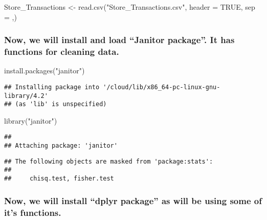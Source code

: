 \documentclass[
]{article}
\newenvironment{Shaded}{\begin{snugshade}}{\end{snugshade}}
\newcommand{\AttributeTok}[1]{\textcolor[rgb]{0.77,0.63,0.00}{#1}}
\newcommand{\ConstantTok}[1]{\textcolor[rgb]{0.00,0.00,0.00}{#1}}
\newcommand{\FunctionTok}[1]{\textcolor[rgb]{0.00,0.00,0.00}{#1}}
\newcommand{\NormalTok}[1]{#1}
\newcommand{\OtherTok}[1]{\textcolor[rgb]{0.56,0.35,0.01}{#1}}
\newcommand{\StringTok}[1]{\textcolor[rgb]{0.31,0.60,0.02}{#1}}
\begin{document}
\begin{Shaded}
\begin{Highlighting}[]
\NormalTok{Store\_Transactions }\OtherTok{\textless{}{-}} \FunctionTok{read.csv}\NormalTok{(}\StringTok{"Store\_Transactions.csv"}\NormalTok{, }\AttributeTok{header =} \ConstantTok{TRUE}\NormalTok{, }\AttributeTok{sep =} \StringTok{\textquotesingle{},\textquotesingle{}}\NormalTok{)}
\end{Highlighting}
\end{Shaded}

\hypertarget{now-we-will-install-and-load-janitor-package.-it-has-functions-for-cleaning-data.}{%
\subsubsection{Now, we will install and load ``Janitor package''. It has
functions for cleaning
data.}\label{now-we-will-install-and-load-janitor-package.-it-has-functions-for-cleaning-data.}}

\begin{Shaded}
\begin{Highlighting}[]
\FunctionTok{install.packages}\NormalTok{(}\StringTok{"janitor"}\NormalTok{)}
\end{Highlighting}
\end{Shaded}

\begin{verbatim}
## Installing package into '/cloud/lib/x86_64-pc-linux-gnu-library/4.2'
## (as 'lib' is unspecified)
\end{verbatim}

\begin{Shaded}
\begin{Highlighting}[]
\FunctionTok{library}\NormalTok{(}\StringTok{"janitor"}\NormalTok{)}
\end{Highlighting}
\end{Shaded}

\begin{verbatim}
## 
## Attaching package: 'janitor'
\end{verbatim}

\begin{verbatim}
## The following objects are masked from 'package:stats':
## 
##     chisq.test, fisher.test
\end{verbatim}

\hypertarget{now-we-will-install-dplyr-package-as-will-be-using-some-of-its-functions.}{%
\subsubsection{Now, we will install ``dplyr package'' as will be using
some of it's
functions.}\label{now-we-will-install-dplyr-package-as-will-be-using-some-of-its-functions.}}
\end{document}
